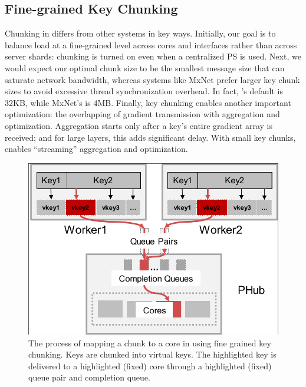 \subsection{Fine-grained Key Chunking}


Chunking in \phub differs from other systems in key ways. Initially, our goal is to balance load at a fine-grained level across cores and interfaces rather than across server shards: chunking is turned on even when a centralized PS is used. Next, we would expect our optimal chunk size to be the smallest message size that can saturate network bandwidth, whereas systems like MxNet prefer larger key chunk sizes to avoid excessive thread synchronization overhead.
In fact, \phub's default is 32KB, while MxNet's is 4MB.
Finally, key chunking enables another important optimization: the overlapping of gradient transmission with aggregation and optimization. Aggregation starts only after a key's entire gradient array is received; and for large layers, this adds significant delay. With small key chunks, \phub enables ``streaming'' aggregation and optimization.

\begin{figure}[t!]
	\centering
	\includegraphics[width=.5\linewidth,trim=1 1 1 1,clip]{Figures/MappingChunkToCore.pdf}
	\caption{The process of mapping a chunk to a core in \phub using fine grained key chunking. Keys are chunked into virtual keys. The highlighted key is delivered to a highlighted (fixed) core through a highlighted (fixed) queue pair and completion queue. }
	\label{fig:mappingChunkToCore}
\end{figure}


